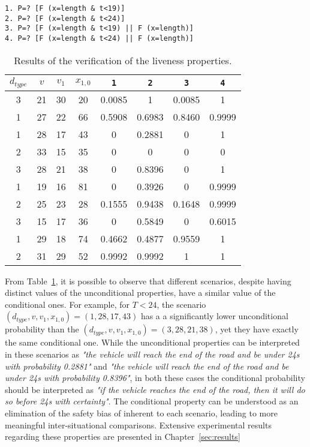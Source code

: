 \begin{minipage}{\linewidth}
{\vspace{1em}
\begin{lstlisting}
1. P=? [F (x=length & t<19)]
2. P=? [F (x=length & t<24)]
3. P=? [F (x=length & t<19) || F (x=length)]
4. P=? [F (x=length & t<24) || F (x=length)]
\end{lstlisting}
}
\end{minipage}

\bgroup
\def\arraystretch{1.3}
\begin{table}[h]
\centering
\begin{tabular}{|c|c|c|c||c|c||c|c|}
\hline
\textbf{$d_{type}$} & \textbf{$v$} & \textbf{$v_1$} & \textbf{$x_{1,0}$} & \texttt{1} & \texttt{2} & \texttt{3} & \texttt{4}  \\ \hline \hline
3 & 21 & 30 & 20 & 0.0085 & 1 & 0.0085 & 1 \\ \hline
1 & 27 & 22 & 66 & 0.5908 & 0.6983 & 0.8460 & 0.9999 \\ \hline
1 & 28 & 17 & 43 & 0 & 0.2881 & 0 & 1 \\ \hline
2 & 33 & 15 & 35 & 0 & 0 & 0 & 0 \\ \hline
3 & 28 & 21 & 38 & 0 & 0.8396 & 0 & 1 \\ \hline
1 & 19 & 16 & 81 & 0 & 0.3926 & 0 & 0.9999 \\ \hline
2 & 25 & 23 & 28 & 0.1555 & 0.9438 & 0.1648 & 0.9999 \\ \hline
3 & 15 & 17 & 36 & 0 & 0.5849 & 0 & 0.6015 \\ \hline
1 & 29 & 18 & 74 & 0.4662 & 0.4877 & 0.9559 & 1 \\ \hline
2 & 31 & 29 & 52 & 0.9992 & 0.9992 & 1 & 1 \\ \hline
\end{tabular}
\caption{Results of the verification of the liveness properties.}
\label{tab:liveness}
\end{table}
\egroup

From Table~\ref{tab:liveness}, it is possible to observe that different scenarios, despite having distinct values of the unconditional properties, have a similar value of the conditional ones. For example, for $T < 24$, the scenario $(d_{type}, v, v_1, x_{1,0}) = (1, 28, 17, 43)$ has a a significantly lower unconditional probability than the $(d_{type}, v, v_1, x_{1,0}) = (3, 28, 21, 38)$, yet they have exactly the same conditional one. While the unconditional properties can be interpreted in these scenarios as \textit{"the vehicle will reach the end of the road and be under 24s with probability 0.2881"} and \textit{"the vehicle will reach the end of the road and be under 24s with probability 0.8396"},  in both these cases the conditional probability should be interpreted as \textit{"if the vehicle reaches the end of the road, then it will do so before 24s with certainty"}. The conditional property can be understood as an elimination of the safety bias of inherent to each scenario, leading to more meaningful inter-situational comparisons. Extensive experimental results regarding these properties are presented in Chapter~\ref{sec:results}

